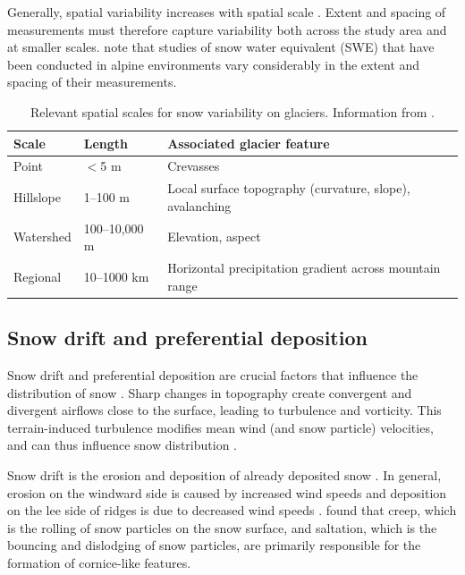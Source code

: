 \documentclass{sfuthesis}
\begin{document}
Generally, spatial variability increases with spatial scale \citep{Clark2011}. Extent and spacing of measurements must therefore capture variability both across the study area and at smaller scales. \cite{Clark2011} note that studies of snow water equivalent (SWE) that have been conducted in alpine environments vary considerably in the extent and spacing of their measurements. 

\begin{table}[]
\centering
\caption{Relevant spatial scales for snow variability on glaciers. Information from \cite{Clark2011}.}
\label{scale}
\begin{tabular}{lll}
\textbf{Scale} & \textbf{Length} & \textbf{Associated glacier feature}                     \\ \hline
Point          & $<$5 m         & Crevasses                                               \\
Hillslope      & 1--100 m        & Local surface topography (curvature, slope), avalanching        \\
Watershed      & 100--10,000 m   & Elevation, aspect                                       \\
Regional       & 10--1000 km     & Horizontal precipitation gradient across mountain range
\end{tabular}
\end{table}

\subsection{Snow drift and preferential deposition}
Snow drift and preferential deposition are crucial factors that influence the distribution of snow \citep{Lehning2008, Winstral2002, Clark2011}. Sharp changes in topography create convergent and divergent airflows close to the surface, leading to turbulence and vorticity. This terrain-induced turbulence modifies mean wind (and snow particle) velocities, and can thus influence snow distribution \citep{Mott2008, Lehning2008, Dadic2010}.

Snow drift is the erosion and deposition of already deposited snow \citep{Dadic2010}. In general, erosion on the windward side is caused by increased wind speeds and deposition on the lee side of ridges is due to decreased wind speeds \citep{Liston1998, Mott2008, Dadic2010}. \cite{Mott2010} found that creep, which is the rolling of snow particles on the snow surface, and saltation, which is the bouncing and dislodging of snow particles, are primarily responsible for the formation of cornice-like features. 
\end{document}
